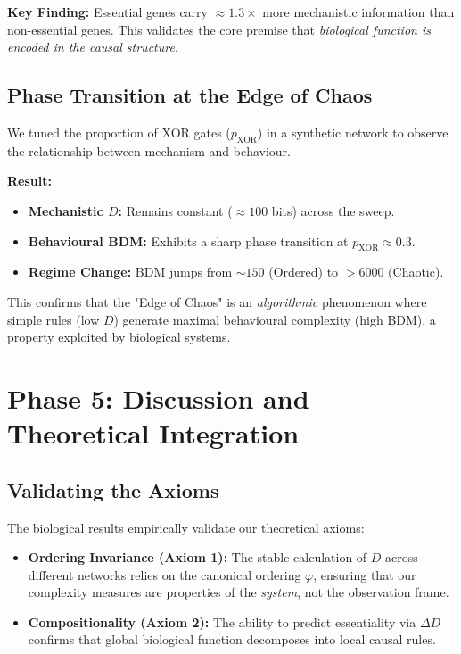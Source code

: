 \documentclass{article}
\begin{document}
\textbf{Key Finding:} Essential genes carry $\approx 1.3\times$ more mechanistic information than non-essential genes. This validates the core premise that \textit{biological function is encoded in the causal structure}.

\subsection{Phase Transition at the Edge of Chaos}
We tuned the proportion of XOR gates ($p_{\text{XOR}}$) in a synthetic network to observe the relationship between mechanism and behaviour.

\textbf{Result:}
\begin{itemize}
    \item \textbf{Mechanistic $D$:} Remains constant ($\approx 100$ bits) across the sweep.
    \item \textbf{Behavioural BDM:} Exhibits a sharp phase transition at $p_{\text{XOR}} \approx 0.3$.
    \item \textbf{Regime Change:} BDM jumps from $\sim 150$ (Ordered) to $> 6000$ (Chaotic).
\end{itemize}

This confirms that the "Edge of Chaos" is an \textit{algorithmic} phenomenon where simple rules (low $D$) generate maximal behavioural complexity (high BDM), a property exploited by biological systems.

\section{Phase 5: Discussion and Theoretical Integration}

\subsection{Validating the Axioms}
The biological results empirically validate our theoretical axioms:
\begin{itemize}
    \item \textbf{Ordering Invariance (Axiom 1):} The stable calculation of $D$ across different networks relies on the canonical ordering $\varphi$, ensuring that our complexity measures are properties of the \textit{system}, not the observation frame.
    \item \textbf{Compositionality (Axiom 2):} The ability to predict essentiality via $\Delta D$ confirms that global biological function decomposes into local causal rules.
\end{itemize}
\end{document}
